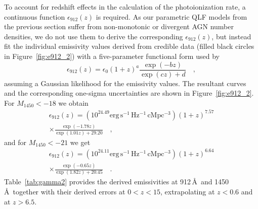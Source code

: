 \documentclass[fleqn,usenatbib]{mnras}
\begin{document}
To account for redshift effects in the calculation of the  photoionization rate,
a continuous function $\epsilon_{912}\left(z\right)$ is required. As our parametric QLF models
from the previous section suffer from non-monotonic or divergent AGN number densities,
we do not use them to derive the corresponding $\epsilon_{912}\left(z\right)$, but
instead fit the individual emissivity values derived from credible data
(filled black circles in Figure~\ref{fig:e912_2}) with a 
five-parameter functional form used by \citet{2012ApJ...746..125H}
\begin{equation}
  \epsilon_{912}\left(z\right)=\epsilon_0(1+z)^a\frac{\exp(-bz)}{\exp(cz)+d}\quad,
  \label{eqn:e912fit}
\end{equation}
assuming a Gaussian likelihood for the emissivity values.
The resultant curves and the corresponding one-sigma
uncertainties are shown in Figure~\ref{fig:e912_2}. For $M_{1450}<-18$
we obtain
\begin{multline}
  \epsilon_{912}\left(z\right)=\left(10^{24.49}\mathrm{erg\, s^{-1}\, Hz^{-1}\, cMpc^{-3}}\right)\left(1+z\right)^{7.57}\\\times\frac{\exp(-1.78z)}{\exp(1.01z)+29.20}\quad,
  \label{eqn:e912_18}
\end{multline}
 and for $M_{1450}<-21$ we get
\begin{multline}
  \epsilon_{912}\left(z\right)=\left(10^{24.11}\mathrm{erg\, s^{-1}\, Hz^{-1}\, cMpc^{-3}}\right)\left(1+z\right)^{6.64}\\\times\frac{\exp(-0.65z)}{\exp(1.82z)+20.45}\quad.
  \label{eqn:e912_21}
\end{multline}
Table~\ref{tab:gamma2} provides the derived emissivities at 912\,\AA\ and 1450\,\AA\ together with their
derived errors at $0<z<15$, extrapolating at $z<0.6$ and at $z>6.5$. 



\end{document}
